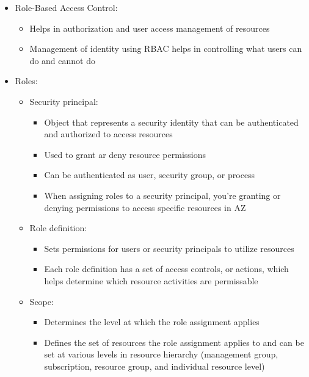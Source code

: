 \documentclass[11pt]{scrartcl}
\begin{document}
\begin{itemize}
	\item Role-Based Access Control:
	\begin{itemize}
		\item Helps in authorization and user access management of resources 
		\item Management of identity using RBAC helps in controlling what users can do and cannot do
	\end{itemize}
	\item Roles:
	\begin{itemize}
		\item Security principal:
		\begin{itemize}
			\item Object that represents a security identity that can be authenticated and authorized to access resources
			\item Used to grant ar deny resource permissions
			\item Can be authenticated as user, security group, or process 
			\item When assigning roles to a security principal, you're granting or denying permissions to access specific resources in AZ
		\end{itemize}
		\item Role definition:
		\begin{itemize}
			\item Sets permissions for users or security principals to utilize resources
			\item Each role definition has a set of access controls, or actions, which helps determine which resource activities are permissable
		\end{itemize}
		\item Scope:
		\begin{itemize}
			\item Determines the level at which the role assignment applies
			\item Defines the set of resources the role assignment applies to and can be set at various levels in resource hierarchy (management group, subscription, resource group, and individual resource level)
		\end{itemize}
	\end{itemize}
\end{itemize}
	
	
	
	
	
	
	
	
	
	
	
	
	
	
	
	
	
	
	
	
	
	
	
	
	
	
	
	
	
	
\end{document}
